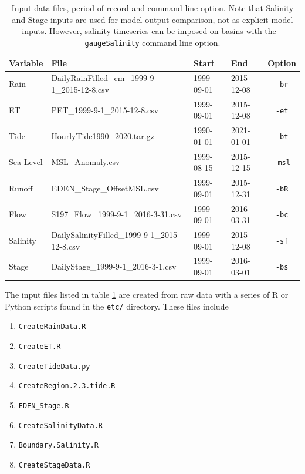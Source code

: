 \begin{table}[H]
\caption{
Input data files, period of record and command line option. Note that Salinity and Stage inputs are used for model output comparison, not as explicit model inputs.  However, salinity timeseries can be imposed on basins with the \texttt{--gaugeSalinity} command line option. 
} 
\centering
\begin{tabular}{ l l l l c }
\hline
Variable  & File & Start & End & Option \\
\hline
Rain      & DailyRainFilled\_cm\_1999-9-1\_2015-12-8.csv
          & 1999-09-01 & 2015-12-08 & \texttt{-br} \\
ET        & PET\_1999-9-1\_2015-12-8.csv
          & 1999-09-01 & 2015-12-08 & \texttt{-et} \\
Tide      & HourlyTide1990\_2020.tar.gz
          & 1990-01-01 & 2021-01-01 & \texttt{-bt} \\
Sea Level & MSL\_Anomaly.csv
          & 1999-08-15 & 2015-12-15 & \texttt{-msl} \\
Runoff    & EDEN\_Stage\_OffsetMSL.csv
          & 1999-09-01 & 2015-12-31 & \texttt{-bR} \\
Flow      & S197\_Flow\_1999-9-1\_2016-3-31.csv
          & 1999-09-01 & 2016-03-31 & \texttt{-bc} \\
Salinity  & DailySalinityFilled\_1999-9-1\_2015-12-8.csv
          & 1999-09-01 & 2015-12-08 & \texttt{-sf} \\
Stage     & DailyStage\_1999-9-1\_2016-3-1.csv 
          & 1999-09-01 & 2016-03-01 & \texttt{-bs} \\
\hline
\end{tabular}
\label{table:Input Data Files and Periods}
\end{table}

The input files listed in table \ref{table:Input Data Files and Periods} are created from raw data with a series of R or Python scripts found in the \texttt{etc/} directory.  These files include\\[-0.5in]
\small
\begin{enumerate}
  \itemsep-8pt
  \item \texttt{CreateRainData.R}
  \item \texttt{CreateET.R}
  \item \texttt{CreateTideData.py}
  \item \texttt{CreateRegion.2.3.tide.R}
  \item \texttt{EDEN\_Stage.R}
  \item \texttt{CreateSalinityData.R}
  \item \texttt{Boundary.Salinity.R}
  \item \texttt{CreateStageData.R}
\end{enumerate}
\large

